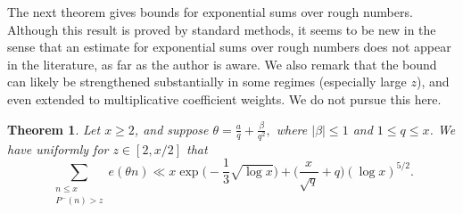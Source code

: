 \documentclass[12pt]{amsart}
\renewcommand{\leq}{\leqslant}
\renewcommand{\geq}{\geqslant}
\numberwithin{equation}{section}
\theoremstyle{plain}
\newtheorem{thm}{Theorem}[section]
\theoremstyle{definition}
\begin{document}
	The next theorem gives bounds for exponential sums over rough numbers. Although this result is proved by standard methods, it seems to be new in the sense that an estimate for exponential sums over rough numbers does not appear in the literature, as far as the author is aware. We also remark that the bound can likely be strengthened substantially in some regimes (especially large $z$), and even extended to multiplicative coefficient weights. We do not pursue this here.
	\begin{thm} \label{exp sum rough}
		Let $x \geq 2$, and suppose $\theta = \frac{a}{q} + \frac{\beta}{q^2},$ where $|\beta| \leq 1$ and $1 \leq q \leq x$. We have uniformly for $z \in [2,x/2]$ that 
		$$\sum_{\substack{n \leq x \\ P^-(n) > z}} e(\theta n) \ll x \exp\bigg(-\frac{1}{3}\sqrt{\log x}\bigg) +\bigg(\frac{x}{\sqrt{q}} + q\bigg)(\log x)^{5/2}.$$
	\end{thm}
\end{document}
